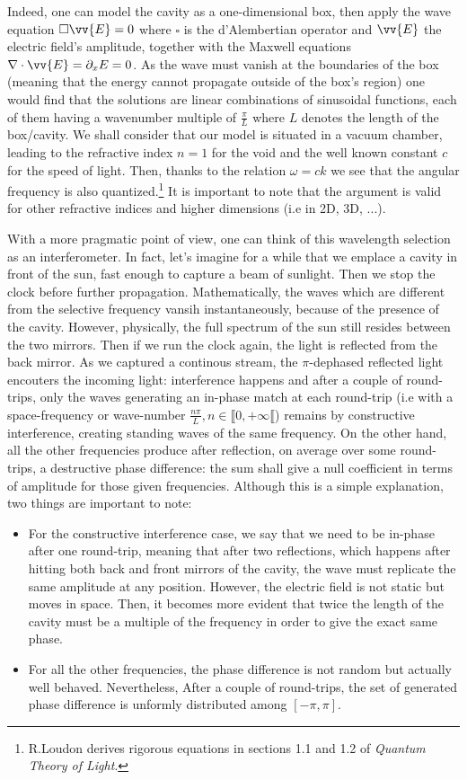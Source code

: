 \documentclass[11pt]{report}
\begin{document}
Indeed, one can model the cavity as a one-dimensional box, then apply the wave equation $ \square \vv{E} = 0$ where $\square$ is the d'Alembertian operator and $\vv{E}$ the electric field's amplitude, together with the Maxwell equations $\nabla \cdot \vv{E} = \partial _x E = 0$. As the wave must vanish at the boundaries of the box (meaning that the energy cannot propagate outside of the box's region) one would find that the solutions are linear combinations of sinusoidal functions, each of them having a wavenumber multiple of $\frac{\pi}{L}$ where $L$ denotes the length of the box/cavity. We shall consider that our model is situated in a vacuum chamber, leading to the refractive index $n=1$ for the void and the well known constant $ c$ for the speed of light. Then, thanks to the relation $\omega = ck$ we see that the angular frequency is also quantized.\footnote{R.Loudon derives rigorous equations in sections 1.1 and 1.2 of \textit{Quantum Theory of Light}.} It is important to note that the argument is valid for other refractive indices and higher dimensions (i.e in 2D, 3D, ...).

With a more pragmatic point of view, one can think of this wavelength selection as an interferometer. In fact, let's imagine for a while that we emplace a cavity in front of the sun, fast enough to capture a beam of sunlight. Then we stop the clock before further propagation. Mathematically, the waves which are different from the selective frequency vansih instantaneously, because of the presence of the cavity. However, physically, the full spectrum of the sun still resides between the two mirrors. Then if we run the clock again, the light is reflected from the back mirror. As we captured a continous stream, the $\pi$-dephased reflected light encouters the incoming light: interference happens and after a couple of round-trips, only the waves generating an in-phase match at each round-trip (i.e with a space-frequency or wave-number $\frac{n\pi}{L}, n\in \llbracket 0, +\infty \llbracket $) remains by constructive interference, creating standing waves of the same frequency. On the other hand, all the other frequencies produce after reflection, on average over some round-trips, a destructive phase difference: the sum shall give a null coefficient in terms of amplitude for those given frequencies. Although this is a simple explanation, two things are important to note:
\begin{itemize}
  \item For the constructive interference case, we say that we need to be in-phase after one round-trip, meaning that after two reflections, which happens after hitting both back and front mirrors of the cavity, the wave must replicate the same amplitude at any position. However, the electric field is not static but moves in space. Then, it becomes more evident that twice the length of the cavity must be a multiple of the frequency in order to give the exact same phase.
  \item  For all the other frequencies, the phase difference is not random but actually well behaved. Nevertheless, After a couple of round-trips, the set of generated phase difference is unformly distributed among $ \left[ -\pi, \pi \right] $.
\end{itemize}
\end{document}
